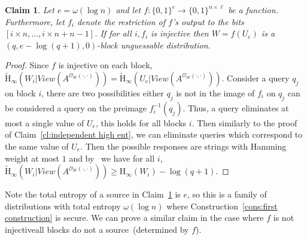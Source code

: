 \documentclass[11pt]{article}
\newcommand{\clref}[1]{\mbox{Claim~\ref{#1}}}
\newcommand{\consref}[1]{\mbox{Construction~\ref{#1}}}
\newcommand{\zo}{\ensuremath{\{0, 1\}}}
\newcommand{\Hoo}{\mathrm{H}_\infty}
\newcommand{\Hav}{\tilde{\mathrm{H}}_\infty}
\newtheorem{claim}[theorem]{Claim}
\begin{document}
\begin{claim}
\label{cl:each block from single seed}
Let $e =\omega(\log n)$ and let $f:\zo^e \rightarrow \zo^{n\times \ell}$ be a function.  Furthermore, let $f_i$ denote the restriction of $f$'s output to the bits $[i\times n,..., i\times n+n-1]$.  If for all $i, f_i$ is injective then $W = f(U_e)$ is a $( q, e - \log (q+1), 0)$-block unguessable distribution.
\end{claim}
\begin{proof}
Since $f$ is injective on each block, $\Hav(W_i | View(A^{\mathcal{O}_{W}(\cdot, \cdot)})) = \Hav(U_e | View(A^{\mathcal{O}_{W}(\cdot, \cdot)}))$.  Consider a query $q_j$ on block $i$, there are two possibilities either $q_j$ is not in the image of $f_i$ on $q_j$ can be considered a query on the preimage $f_i^{-1}(q_j)$.  Thus, a query eliminates at most a single value of $U_e$, this holds for all blocks $i$.  Then similarly to the proof of \clref{cl:independent high ent}, we can eliminate queries which correspond to the same value of $U_e$.  Then the possible responses are strings with Hamming weight at most $1$ and by~\cite[Lemma 2.2]{DBLP:journals/siamcomp/DodisORS08} we have for all $i$, $\Hav(W_i | View(A^{\mathcal{O}_{W}(\cdot, \cdot)})) \geq \Hoo(W_i) -\log (q+1)$.
\end{proof}

Note the total entropy of a source in \clref{cl:each block from single seed} is $e$, so this is a family of distributions with total entropy $\omega(\log n)$ where \consref{cons:first construction} is secure.  We can prove a similar claim in the case where $f$ is not injectiveall blocks do not a source~(determined by $f$).
\end{document}
